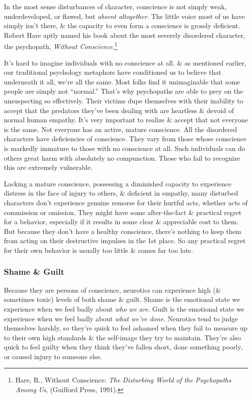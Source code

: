\documentclass{article}
\numberwithin{equation}{section}
\begin{document}
In the most sense disturbances of character, conscience is not simply weak, underdeveloped, or flawed, but \textit{absent altogether}. The little voice most of us have simply isn't there, \& the capacity to even form a conscience is grossly deficient. Robert Hare aptly named his book about the most severely disordered character, the psychopath, \textit{Without Conscience}.\footnote{Hare, R., Without Conscience: \textit{The Disturbing World of the Psychopaths Among Us}, (Guilford Press, 1991).}

It's hard to imagine individuals with no conscience at all. \& as mentioned earlier, our traditional psychology metaphors have conditioned us to believe that underneath it all, we're all the same. Most folks find it unimaginable that some people are simply not ``normal.'' That's why psychopaths are able to prey on the unsuspecting so effectively. Their victims dupe themselves with their inability to accept that the predators they've been dealing with are heartless \& devoid of normal human empathy. It's very important to realize \& accept that not everyone is the same. Not everyone has an active, mature conscience. All the disordered characters have deficiencies of conscience. They vary from those whose conscience is markedly immature to those with no conscience at all. Such individuals can do others great harm with absolutely no compunction. Those who fail to recognize this are extremely vulnerable.

Lacking a mature conscience, possessing a diminished capacity to experience distress in the face of injury to others, \& deficient in empathy, many disturbed characters don't experience genuine remorse for their hurtful acts, whether acts of commission or omission. They might have some after-the-fact \& practical regret for a behavior, especially if it results in some clear \& appreciable cost to them. But because they don't have a healthy conscience, there's nothing to keep them from acting on their destructive impulses in the 1st place. So any practical regret for their own behavior is usually too little \& comes far too late.

\subsubsection{Shame \& Guilt}
Because they are persons of conscience, neurotics can experience high (\& sometimes toxic) levels of both shame \& guilt. Shame is the emotional state we experience when we feel badly about \textit{who we are}. Guilt is the emotional state we experience when we feel badly about \textit{what we've done}. Neurotics tend to judge themselves harshly, so they're quick to feel ashamed when they fail to measure up to their own high standards \& the self-image they try to maintain. They're also quick to feel guilty when they think they've fallen short, done something poorly, or caused injury to someone else.
	
\end{document}
